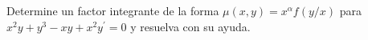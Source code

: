 Determine un factor integrante de la forma $\mu(x,y)=x^\alpha f(y/x)$ para $x^2y+y^3-xy+x^2y^{\prime}=0$ y resuelva con su ayuda.
